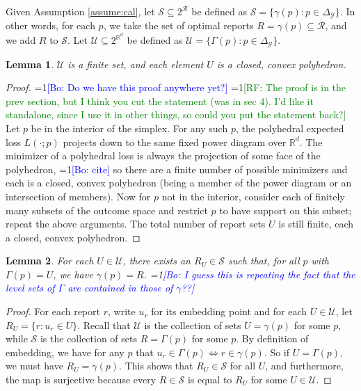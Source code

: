 \documentclass[12pt]{article}
\newcommand{\Comments}{1}
\newcommand{\mynote}[2]{\ifnum\Comments=1\textcolor{#1}{#2}\fi}
\newcommand{\raf}[1]{\mynote{green}{[RF: #1]}}
\newcommand{\bo}[1]{\mynote{blue}{[Bo: #1]}}
\newcommand{\reals}{\mathbb{R}}
\newcommand{\R}{\mathcal{R}}
\newcommand{\U}{\mathcal{U}}
\newcommand{\Y}{\mathcal{Y}}
\newtheorem{lemma}{Lemma}
\begin{document}
Given Assumption \ref{assume:cal}, let $\mathcal{S} \subseteq 2^{\R}$ be defined as $\mathcal{S} = \{\gamma(p) : p \in \Delta_{\Y}\}$.
In other words, for each $p$, we take the set of optimal reports $R = \gamma(p) \subseteq \R$, and we add $R$ to $\mathcal{S}$.
Let $\U \subseteq 2^{\reals^d}$ be defined as $\U = \{\Gamma(p) : p \in \Delta_{\Y}\}$.

\begin{lemma} \label{lemma:U-convex-closed}
  $\U$ is a finite set, and each element $U$ is a closed, convex polyhedron.
\end{lemma}
\begin{proof}
  \bo{Do we have this proof anywhere yet?}
  \raf{The proof is in the prev section, but I think you cut the statement (was in sec 4).  I'd like it standalone, since I use it in other things, so could you put the statement back?}
  Let $p$ be in the interior of the simplex.
  For any such $p$, the polyhedral expected loss $L(\cdot;p)$ projects down to the same fixed power diagram over $\reals^d$.
  The minimizer of a polyhedral loss is always the projection of some face of the polyhedron, \bo{cite} so there are a finite number of possible minimizers and each is a closed, convex polyhedron (being a member of the power diagram or an intersection of members).
  Now for $p$ not in the interior, consider each of finitely many subsets of the outcome space and restrict $p$ to have support on this subset; repeat the above arguments.
  The total number of report sets $U$ is still finite, each a closed, convex polyhedron.
\end{proof}

\begin{lemma} \label{lemma:U-surject}
  For each $U \in \U$, there exists an $R_U \in \mathcal{S}$ such that, for all $p$ with $\Gamma(p) = U$, we have $\gamma(p) = R$.
  \bo{I guess this is repeating the fact that the level sets of $\Gamma$ are contained in those of $\gamma$??}
\end{lemma}
\begin{proof}
  For each report $r$, write $u_r$ for its embedding point and for each $U \in \U$, let $R_U = \{r : u_r \in U\}$.
  Recall that $\U$ is the collection of sets $U = \gamma(p)$ for some $p$, while $\mathcal{S}$ is the collection of sets $R = \Gamma(p)$ for some $p$.
  By definition of embedding, we have for any $p$ that $u_r \in \Gamma(p) \iff r \in \gamma(p)$.
  So if $U = \Gamma(p)$, we must have $R_U = \gamma(p)$.
  This shows that $R_U \in \mathcal{S}$ for all $U$, and furthermore, the map is surjective because every $R \in \mathcal{S}$ is equal to $R_U$ for some $U \in \U$.
\end{proof}
\end{document}
